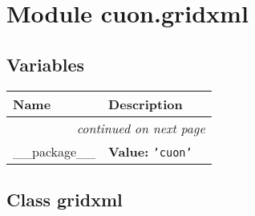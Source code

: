 %
%
%


\section{Module cuon.gridxml}

    \label{cuon:gridxml}


  \subsection{Variables}

    \vspace{-1cm}
\hspace{\varindent}\begin{longtable}{|p{\varnamewidth}|p{\vardescrwidth}|l}
\cline{1-2}
\cline{1-2} \centering \textbf{Name} & \centering \textbf{Description}& \\
\cline{1-2}
\endhead\cline{1-2}\multicolumn{3}{r}{\small\textit{continued on next page}}\\\endfoot\cline{1-2}
\endlastfoot\raggedright \_\-\_\-p\-a\-c\-k\-a\-g\-e\-\_\-\_\- & \raggedright \textbf{Value:} 
{\tt \texttt{'}\texttt{cuon}\texttt{'}}&\\
\cline{1-2}
\end{longtable}



\subsection{Class gridxml}

